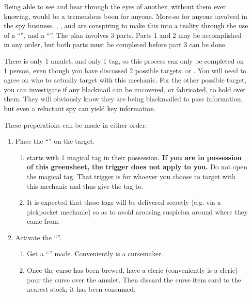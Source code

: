 \documentclass[green]{GL2020}
\begin{document}
\name{\gUnsuspectingBirdie{}}

Being able to see and hear through the eyes of another, without them ever knowing, would be a tremendous boon for anyone. More-so for anyone involved in the spy business. \cAntichup{}, \cScholarship{}, and \cPrince{} are conspiring to make this into a reality through the use of a ``\iMagicTag{}'', and a ``\iScryingAmulet{}''. The plan involves 3 parts. Parts 1 and 2 may be accomplished in any order, but both parts must be completed before part 3 can be done.

There is only 1 amulet, and only 1 tag, so this process can only be completed on 1 person, even though you have discussed 2 possible targets: \cPirate{\full} or \cInitiate{\full}. You will need to agree on who to actually target with this mechanic. For the other possible target, you can investigate if any blackmail can be uncovered, or fabricated, to hold over them. They will obviously know they are being blackmailed to pass information, but even a reluctant spy can yield key information.

These preperations can be made in either order:
\begin{enumerate}
  \item Place the ``\iMagicTag{}'' on the target.
  \begin{enumerate}
    \item \cScholarship{} starts with 1 magical tag in their possession. \textbf{If you are in possession of this greensheet, the trigger does not apply to you.} Do not open the magical tag. That trigger is for whoever you choose to target with this mechanic and thus give the tag to.
    \item It is expected that these tags will be delivered secretly (e.g. via a pickpocket mechanic) so as to avoid arousing suspicion around where they came from.
  \end{enumerate}
  \item Activate the ``\iAmulet{}''.
  \begin{enumerate}
     \item Get a ``\iBlindness{}'' made. Conveniently \cPrince{} is a cursemaker.
     \item Once the curse has been brewed, have a cleric (conveniently  \cAntiChup{} is a cleric) pour the curse over the amulet. Then discard the curse item card to the nearest stock; it has been consumed.
  \end{enumerate}
\end{enumerate}
\end{document}
